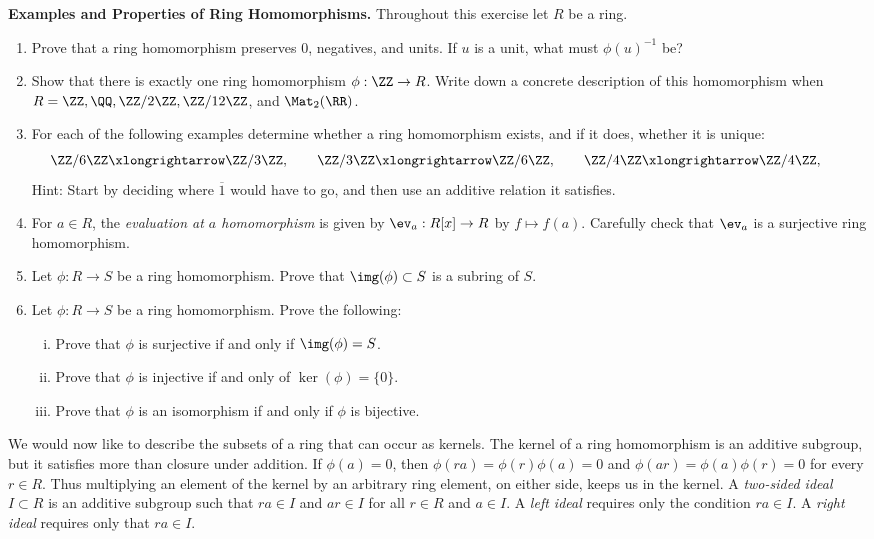 \documentclass[12pt,reqno]{amsart}
\begin{document}
\begin{problems}
\item\label{r:maps} \textbf{Examples and Properties of Ring Homomorphisms.} Throughout this exercise let $R$ be a ring.
\begin{enumerate}
\item Prove that a ring homomorphism preserves $0$, negatives, and units. If $u$ is a unit, what must $\phi(u)^{-1}$ be?
\item Show that there is exactly one ring homomorphism $\phi:\ZZ\to R$. Write down a concrete description of this homomorphism when $R=\ZZ,\QQ,\ZZ/2\ZZ,\ZZ/12\ZZ$, and $\Mat_{2}(\RR)$.
\item For each of the following examples determine whether a ring homomorphism exists, and if it does, whether it is unique:
\[
  \ZZ/6\ZZ\xlongrightarrow\ZZ/3\ZZ,\qquad  \ZZ/3\ZZ\xlongrightarrow\ZZ/6\ZZ,\qquad   \ZZ/4\ZZ\xlongrightarrow\ZZ/4\ZZ,\qquad
\]
Hint: Start by deciding where $\overline1$ would have to go, and then use an additive relation it satisfies.
\item For $a\in R$, the \emph{evaluation at $a$ homomorphism} is given by $\ev_a:R[x]\to R$ by $f\mapsto f(a)$. Carefully check that $\ev_{a}$ is a surjective ring homomorphism. 	
\item Let $\phi:R \to S$ be a ring homomorphism. Prove that $\img(\phi) \subset S$ is a subring of $S$.
\item Let $\phi:R \to S$ be a ring homomorphism. Prove the following:
\begin{enumerate}[(i)]
	\item Prove that $\phi$ is surjective if and only if $\img(\phi)=S$.
	\item Prove that $\phi$ is injective if and only of $\ker(\phi)=\{0\}$. 
	\item Prove that $\phi$ is an isomorphism if and only if $\phi$ is bijective. 
\end{enumerate}
\end{enumerate}
\end{problems}

\hrulefill


We would now like to describe the subsets of a ring that can occur as kernels. The kernel of a ring homomorphism is an additive subgroup, but it satisfies more than closure under addition. If $\phi(a)=0$, then $\phi(ra)=\phi(r)\phi(a)=0$ and $\phi(ar)=\phi(a)\phi(r)=0$ for every $r\in R$. Thus multiplying an element of the kernel by an arbitrary ring element, on either side, keeps us in the kernel. A \emph{two-sided ideal} $I\subset R$ is an additive subgroup such that $ra\in I$ and $ar\in I$ for all $r\in R$ and $a\in I$. A \emph{left ideal} requires only the condition $ra\in I$. A \emph{right ideal} requires only that $ra\in I$. 
\end{document}
